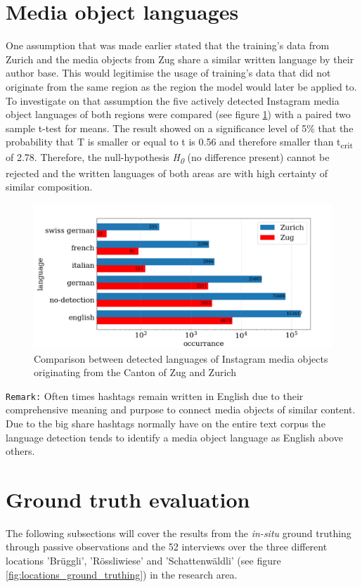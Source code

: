 \section{Media object languages}
One assumption that was made earlier stated that the training's data from Zurich and the media objects from Zug share a similar written language by their author base. This would legitimise the usage of training's data that did not originate from the same region as the region the model would later be applied to.\\
To investigate on that assumption the five actively detected Instagram media object languages of both regions were compared (see figure \ref{fig:det_languages}) with a paired two sample t-test for means. The result showed on a significance level of 5\% that the probability that T is smaller or equal to t is 0.56 and therefore smaller than t\textsubscript{crit} of 2.78. Therefore, the null-hypothesis \textit{H\textsubscript{0}} (no difference present) cannot be rejected and the written languages of both areas are with high certainty of similar composition.

\begin{figure}[h!]
   \centering
   \includegraphics[width=\textwidth]{img/det_languages_bigger_font.pdf}
   \caption{Comparison between detected languages of Instagram media objects originating from the Canton of Zug and Zurich}
   \label{fig:det_languages}
\end{figure}

\texttt{Remark:} Often times hashtags remain written in English due to their comprehensive meaning and purpose to connect media objects of similar content. Due to the big share hashtags normally have on the entire text corpus the language detection tends to identify a media object language as English above others.

\section{Ground truth evaluation}
The following subsections will cover the results from the \textit{in-situ} ground truthing through passive observations and the 52 interviews over the three different locations 'Br\"uggli', 'R\"ossliwiese' and 'Schattenw\"aldli' (see figure \ref{fig:locations_ground_truthing}) in the research area.

